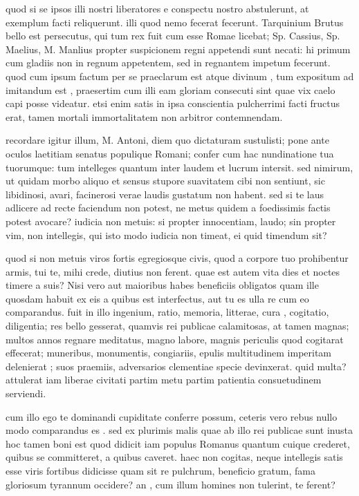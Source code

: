  quod si se ipsos illi nostri liberatores e conspectu nostro abstulerunt, at exemplum facti reliquerunt. illi quod nemo fecerat fecerunt. Tarquinium Brutus bello est persecutus, qui tum rex fuit cum esse Romae licebat; Sp. Cassius, Sp. Maelius, M. Manlius propter suspicionem regni appetendi sunt necati: hi primum cum gladiis non in regnum appetentem, sed in regnantem impetum fecerunt. quod cum ipsum factum per se praeclarum est atque divinum , tum expositum ad imitandum est , praesertim cum illi eam gloriam consecuti sint quae vix caelo capi posse videatur. etsi enim satis in ipsa conscientia pulcherrimi facti fructus erat, tamen mortali immortalitatem non arbitror contemnendam.

 recordare igitur illum, M. Antoni, diem quo dictaturam sustulisti; pone ante oculos laetitiam senatus populique Romani; confer cum hac nundinatione tua tuorumque: tum intelleges quantum inter laudem et lucrum intersit. sed nimirum, ut quidam morbo aliquo et sensus stupore suavitatem cibi non sentiunt, sic libidinosi, avari, facinerosi verae laudis gustatum non habent. sed si te laus adlicere ad recte faciendum non potest, ne metus quidem a foedissimis factis potest avocare? iudicia non metuis: si propter innocentiam, laudo; sin propter vim, non intellegis, qui isto modo iudicia non timeat, ei quid timendum sit?

 quod si non metuis viros fortis egregiosque civis, quod a corpore tuo prohibentur armis, tui te, mihi crede, diutius non ferent. quae est autem vita dies et noctes timere a suis? Nisi vero aut maioribus habes beneficiis obligatos quam ille quosdam habuit ex eis a quibus est interfectus, aut tu es ulla re cum eo comparandus. fuit in illo ingenium, ratio, memoria, litterae, cura , cogitatio, diligentia; res bello gesserat, quamvis rei publicae calamitosas, at tamen magnas; multos annos regnare meditatus, magno labore, magnis periculis quod cogitarat effecerat; muneribus, monumentis, congiariis, epulis multitudinem imperitam delenierat ; suos praemiis, adversarios clementiae specie devinxerat. quid multa? attulerat iam liberae civitati partim metu partim patientia consuetudinem serviendi.

 cum illo ego te dominandi cupiditate conferre possum, ceteris vero rebus nullo modo comparandus es . sed ex plurimis malis quae ab illo rei publicae sunt inusta hoc tamen boni est quod didicit iam populus Romanus quantum cuique crederet, quibus se committeret, a quibus caveret. haec non cogitas, neque intellegis satis esse viris fortibus didicisse quam sit re pulchrum, beneficio gratum, fama gloriosum tyrannum occidere? an , cum illum homines non tulerint, te ferent?

